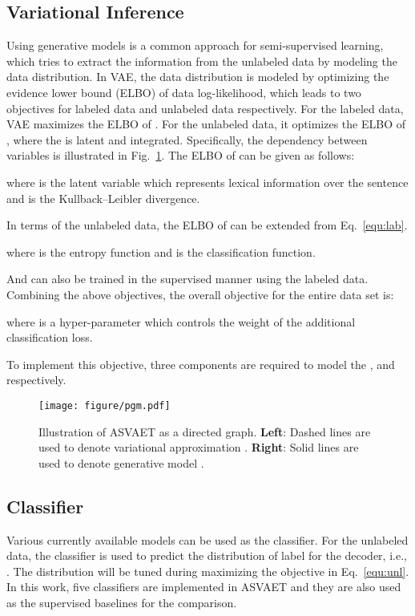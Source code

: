 \documentclass[11pt,a4paper]{article}
\begin{document}
\subsection{Variational Inference}
\label{sec:vi}
Using generative models is a common approach for semi-supervised learning, which tries to extract the information from the unlabeled data by modeling the data distribution.
In VAE, the data distribution is modeled by optimizing the evidence lower bound (ELBO) of data log-likelihood, which leads to two objectives for labeled data and unlabeled data respectively.
For the labeled data, VAE maximizes the ELBO of . For the unlabeled data, it optimizes the ELBO of , where the  is latent and integrated.
Specifically, the dependency between variables is illustrated in Fig.~\ref{fig:vi}.
The ELBO of  can be given as follows:

where  is the latent variable which represents lexical information over the sentence and  is the Kullback–Leibler divergence.

In terms of the unlabeled data, the ELBO of  can be extended from Eq.~\ref{equ:lab}.

where  is the entropy function and  is the classification function.

And  can also be trained in the supervised manner using the labeled data.
Combining the above objectives, the overall objective for the entire data set is:


where   is a hyper-parameter which controls the weight of the additional classification loss. 

To implement this objective, three components are required to model the ,  and  respectively.


\begin{figure}
	\centering
	\texttt{[image: figure/pgm.pdf]}
	\caption{Illustration of ASVAET as a directed graph. \textbf{Left}: Dashed lines are used to denote variational approximation . \textbf{Right}: Solid lines are used to denote generative model .}\label{fig:vi}
\end{figure}


\subsection{Classifier}
Various currently available models can be used as the classifier. For the unlabeled data, the classifier is used to predict the distribution of label  for the decoder, i.e., .
The distribution  will be tuned during maximizing the objective in Eq.~\ref{equ:unl}.
In this work, five classifiers are implemented in ASVAET and they are also used as the supervised baselines for the comparison.
\end{document}
